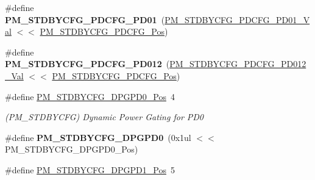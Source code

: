 \begin{DoxyCompactItemize}
\item 
\hypertarget{group___s_a_m_l21___p_m_ga31bed94fd0e6748e1e24434fdce42fb7}{}\#define {\bfseries P\+M\+\_\+\+S\+T\+D\+B\+Y\+C\+F\+G\+\_\+\+P\+D\+C\+F\+G\+\_\+\+P\+D01}~(\hyperlink{group___s_a_m_l21___p_m_ga7db06b2806877e425348a3fdc87b5a14}{P\+M\+\_\+\+S\+T\+D\+B\+Y\+C\+F\+G\+\_\+\+P\+D\+C\+F\+G\+\_\+\+P\+D01\+\_\+\+Val}    $<$$<$ \hyperlink{group___s_a_m_l21___p_m_ga19332dcd50a38dcde23771afb543cfef}{P\+M\+\_\+\+S\+T\+D\+B\+Y\+C\+F\+G\+\_\+\+P\+D\+C\+F\+G\+\_\+\+Pos})\label{group___s_a_m_l21___p_m_ga31bed94fd0e6748e1e24434fdce42fb7}

\item 
\hypertarget{group___s_a_m_l21___p_m_gaf86dfff90647647e7afd091fc367e31a}{}\#define {\bfseries P\+M\+\_\+\+S\+T\+D\+B\+Y\+C\+F\+G\+\_\+\+P\+D\+C\+F\+G\+\_\+\+P\+D012}~(\hyperlink{group___s_a_m_l21___p_m_ga29382ddddd347cbbc9511caa1376ef09}{P\+M\+\_\+\+S\+T\+D\+B\+Y\+C\+F\+G\+\_\+\+P\+D\+C\+F\+G\+\_\+\+P\+D012\+\_\+\+Val}   $<$$<$ \hyperlink{group___s_a_m_l21___p_m_ga19332dcd50a38dcde23771afb543cfef}{P\+M\+\_\+\+S\+T\+D\+B\+Y\+C\+F\+G\+\_\+\+P\+D\+C\+F\+G\+\_\+\+Pos})\label{group___s_a_m_l21___p_m_gaf86dfff90647647e7afd091fc367e31a}

\item 
\hypertarget{group___s_a_m_l21___p_m_ga18464e63ed1613c3fcacb238ea318bd0}{}\#define \hyperlink{group___s_a_m_l21___p_m_ga18464e63ed1613c3fcacb238ea318bd0}{P\+M\+\_\+\+S\+T\+D\+B\+Y\+C\+F\+G\+\_\+\+D\+P\+G\+P\+D0\+\_\+\+Pos}~4\label{group___s_a_m_l21___p_m_ga18464e63ed1613c3fcacb238ea318bd0}

\begin{DoxyCompactList}\small\item\em (P\+M\+\_\+\+S\+T\+D\+B\+Y\+C\+F\+G) Dynamic Power Gating for P\+D0 \end{DoxyCompactList}\item 
\hypertarget{group___s_a_m_l21___p_m_ga645e354c2188065fe7b769b071dffcc4}{}\#define {\bfseries P\+M\+\_\+\+S\+T\+D\+B\+Y\+C\+F\+G\+\_\+\+D\+P\+G\+P\+D0}~(0x1ul $<$$<$ P\+M\+\_\+\+S\+T\+D\+B\+Y\+C\+F\+G\+\_\+\+D\+P\+G\+P\+D0\+\_\+\+Pos)\label{group___s_a_m_l21___p_m_ga645e354c2188065fe7b769b071dffcc4}

\item 
\hypertarget{group___s_a_m_l21___p_m_gac352d235bc58ad52cd1c8fbed00f993a}{}\#define \hyperlink{group___s_a_m_l21___p_m_gac352d235bc58ad52cd1c8fbed00f993a}{P\+M\+\_\+\+S\+T\+D\+B\+Y\+C\+F\+G\+\_\+\+D\+P\+G\+P\+D1\+\_\+\+Pos}~5\label{group___s_a_m_l21___p_m_gac352d235bc58ad52cd1c8fbed00f993a}


\end{DoxyCompactItemize}
